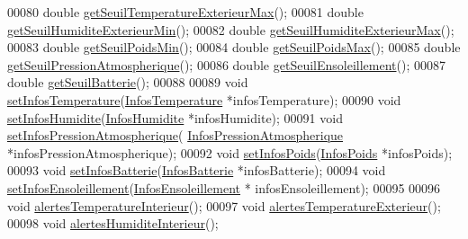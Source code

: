 \begin{DoxyCode}
00080         \textcolor{keywordtype}{double} \hyperlink{class_alertes_a00d834877e1fc34d7e0659ef6963ac4f}{getSeuilTemperatureExterieurMax}();
00081         \textcolor{keywordtype}{double} \hyperlink{class_alertes_a68e467e042b615f56347a0953d6e64f1}{getSeuilHumiditeExterieurMin}();
00082         \textcolor{keywordtype}{double} \hyperlink{class_alertes_ad2c8daf5668f5d122efb9b84f7ea86de}{getSeuilHumiditeExterieurMax}();
00083         \textcolor{keywordtype}{double} \hyperlink{class_alertes_a228829e2826ee20cc014b2eb54addf14}{getSeuilPoidsMin}();
00084         \textcolor{keywordtype}{double} \hyperlink{class_alertes_a2c19b460f7f7cc7a867b5ed634371878}{getSeuilPoidsMax}();
00085         \textcolor{keywordtype}{double} \hyperlink{class_alertes_a502fa36037246fb6eaad1db859bc1971}{getSeuilPressionAtmospherique}();
00086         \textcolor{keywordtype}{double} \hyperlink{class_alertes_a54900058557979664d25137399ae2512}{getSeuilEnsoleillement}();
00087         \textcolor{keywordtype}{double} \hyperlink{class_alertes_adcf9f9fb707944ae17f2355819eb58d1}{getSeuilBatterie}();
00088 
00089         \textcolor{keywordtype}{void} \hyperlink{class_alertes_a091a0fabca5b06302bc19de31aecafff}{setInfosTemperature}(\hyperlink{class_infos_temperature}{InfosTemperature} *infosTemperature);
00090         \textcolor{keywordtype}{void} \hyperlink{class_alertes_a05734ac9e97a9001de4ce9ef96235c87}{setInfosHumidite}(\hyperlink{class_infos_humidite}{InfosHumidite} *infosHumidite);
00091         \textcolor{keywordtype}{void} \hyperlink{class_alertes_a771133f26d4ab8c90d1bdf50e1d23d87}{setInfosPressionAtmospherique}(
      \hyperlink{class_infos_pression_atmospherique}{InfosPressionAtmospherique} *infosPressionAtmospherique);
00092         \textcolor{keywordtype}{void} \hyperlink{class_alertes_a100bad47769994abc976419a355c4a26}{setInfosPoids}(\hyperlink{class_infos_poids}{InfosPoids} *infosPoids);
00093         \textcolor{keywordtype}{void} \hyperlink{class_alertes_a8bbe30ddc4893f943781749917b23463}{setInfosBatterie}(\hyperlink{class_infos_batterie}{InfosBatterie} *infosBatterie);
00094         \textcolor{keywordtype}{void} \hyperlink{class_alertes_a5379fc65522a77dc2cc110e489e1469d}{setInfosEnsoleillement}(\hyperlink{class_infos_ensoleillement}{InfosEnsoleillement} *
      infosEnsoleillement);
00095 
00096         \textcolor{keywordtype}{void} \hyperlink{class_alertes_a8bc56cf9eb525624b2c1f5b20f86724b}{alertesTemperatureInterieur}();
00097         \textcolor{keywordtype}{void} \hyperlink{class_alertes_a91fb2665fa8b6c32c74bfe4d1b89a2d8}{alertesTemperatureExterieur}();
00098         \textcolor{keywordtype}{void} \hyperlink{class_alertes_a7558cb097dc392547ceb12ab4d6cbd4c}{alertesHumiditeInterieur}();

\end{DoxyCode}
